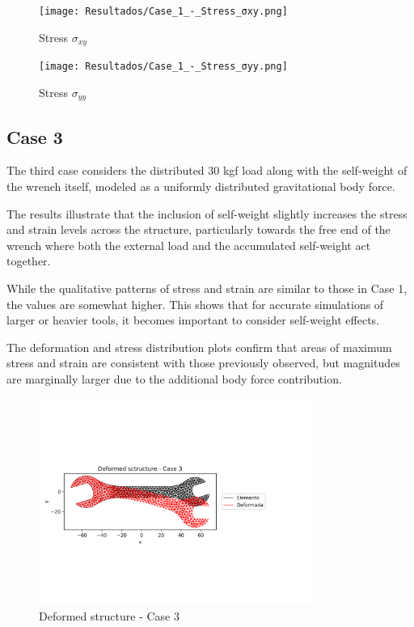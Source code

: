 \documentclass[12pt]{article}
\begin{document}
\begin{figure}[H]
    \centering
    \begin{minipage}{0.48\textwidth}
        \centering
        \texttt{[image: Resultados/Case\_1\_-\_Stress\_σxy.png]}
        \caption{Stress $\sigma_{xy}$}
        \label{fig:fig21}
    \end{minipage}
    \hfill
    \begin{minipage}{0.48\textwidth}
        \centering
        \texttt{[image: Resultados/Case\_1\_-\_Stress\_σyy.png]}
        \caption{Stress $\sigma_{yy}$}
        \label{fig:fig22}
    \end{minipage}
\end{figure}



\newpage
\subsection{Case 3}

The third case considers the distributed 30 kgf load along with the self-weight of the wrench itself, modeled as a uniformly distributed gravitational body force.

The results illustrate that the inclusion of self-weight slightly increases the stress and strain levels across the structure, particularly towards the free end of the wrench where both the external load and the accumulated self-weight act together.

While the qualitative patterns of stress and strain are similar to those in Case 1, the values are somewhat higher.  
This shows that for accurate simulations of larger or heavier tools, it becomes important to consider self-weight effects.

The deformation and stress distribution plots confirm that areas of maximum stress and strain are consistent with those previously observed, but magnitudes are marginally larger due to the additional body force contribution.

\begin{figure}[H]
    \centering
    \includegraphics[width=0.8\textwidth]{Resultados/Deformed_sctructure_-_Case_3.png}
    \caption{Deformed structure - Case 3}
    \label{fig:fig23}
\end{figure}
\end{document}
